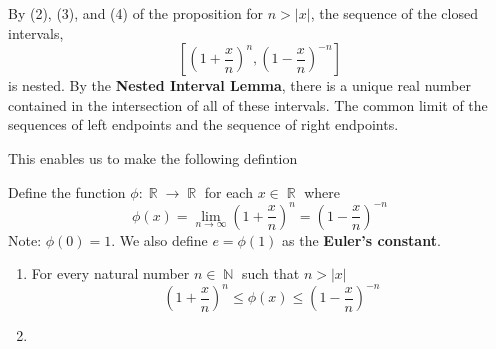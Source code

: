 \documentclass[a4paper, 11pt]{article}
\DeclareMathOperator{\N}{\mathbb{N}}
\DeclareMathOperator{\R}{\mathbb{R}}
\begin{document}
By (2), (3), and (4) of the proposition for $n > |x|$, the sequence of the closed intervals,
\begin{equation*}
  \left[ \left(1 + \frac{x}{n}\right)^n, \left(1 - \frac{x}{n}\right)^{-n}\right]
\end{equation*}
is nested. By the \textbf{Nested Interval Lemma}, there is a unique real number contained in the intersection of all of these
intervals. The common limit of the sequences of left endpoints and the sequence of right endpoints.

This enables us to make the following defintion
\begin{definition}
Define the function $\phi: \R \rightarrow \R$  for each $x \in \R$ where
\begin{equation}
  \phi(x) = \lim_{n\rightarrow \infty} \left(1 + \frac{x}{n}\right)^n = \left(1 - \frac{x}{n}\right)^{-n}
\end{equation}
Note: $\phi(0) = 1$. We also define $e = \phi(1)$ as the \textbf{Euler's constant}.
\end{definition}

\begin{remark}{}
  \begin{enumerate}
    \item For every natural number $n \in \N$ such that $n > |x|$
    \begin{equation}
      \left(1 + \frac{x}{n}\right)^n \leq \phi(x) \leq \left(1 - \frac{x}{n}\right)^{-n}
    \end{equation}
    \item 
  \end{enumerate}
\end{remark}
\end{document}
